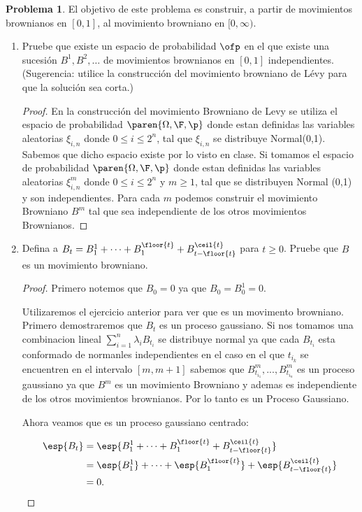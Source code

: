 \documentclass[a5paper,oneside]{amsart}
\theoremstyle{plain}
\theoremstyle{definition}
\newtheorem{problema}{Problema}
\begin{document}
\begin{problema}
El objetivo de este problema es construir, a partir de movimientos brownianos en $[0,1]$, al movimiento browniano en $[0,\infty)$.
\begin{enumerate}
\item Pruebe que existe un espacio de probabilidad $\ofp$ en el que existe una sucesi\'on $B^1,B^2,\ldots$ de movimientos brownianos en $[0,1]$ independientes. (Sugerencia: utilice la construcci\'on del movimiento browniano de L\'evy  para que la soluci\'on sea corta.)

\begin{proof}
En la construcci\'on del movimiento Browniano de Levy se utiliza el espacio de probabilidad $\paren{\Omega, \F,\p}$ donde estan definidas las variables aleatorias $\xi_{i,n}$ donde $0\leq i\leq 2^n$, tal que $\xi_{i,n}$ se distribuye Normal(0,1). Sabemos que dicho espacio existe por lo visto en clase. Si tomamos el espacio de probabilidad $\paren{\Omega, \F,\p}$ donde estan definidas las variables aleatorias  $\xi_{i,n}^m$ donde $0\leq i\leq 2^n$ y $m\geq 1$, tal que se distribuyen Normal (0,1) y son independientes. Para cada $m$ podemos construir el movimiento Browniano $B^m$  tal que sea independiente de los otros movimientos Brownianos.
\end{proof}

\item Defina a $B_t=B^1_1+\cdots+B^{\floor{t}}_1+B^{\ceil{t}}_{t-\floor{t}}$ para $t\geq 0$. Pruebe que $B$ es un movimiento browniano.

\begin{proof}
Primero notemos que $B_0=0$ ya que $B_0=B_{0}^1=0$.

Utilizaremos el ejercicio anterior para ver que es un movimento browniano. Primero demostraremos que $B_t$ es un proceso gaussiano. Si nos tomamos una combinacion lineal $\sum_{i=1}^n\lambda_i B_{t_i}$ se distribuye normal ya que cada $B_{t_i}$ esta conformado de normanles independientes en el caso en el que $t_{i_k}$ se encuentren en el intervalo $[m,m+1]$ sabemos que $B_{t_{i_1}}^m,...,B_{t_{i_n}}^m$ es un proceso gaussiano ya que $B^m$ es un movimiento Browniano y ademas es independiente de los otros movimientos brownianos. Por lo tanto es un Proceso Gaussiano.

Ahora veamos que es un proceso gaussiano centrado:


\begin{align}
\esp{B_t}&=\esp{B^1_1+\cdots+B^{\floor{t}}_1+B^{\ceil{t}}_{t-\floor{t}}}\notag \\
&=\esp{B^1_1}+\cdots+\esp{B^{\floor{t}}_1}+\esp{B^{\ceil{t}}_{t-\floor{t}}} \notag \\
&=0.
\end{align}


\end{proof}
\end{enumerate}
\end{problema}
\end{document}

